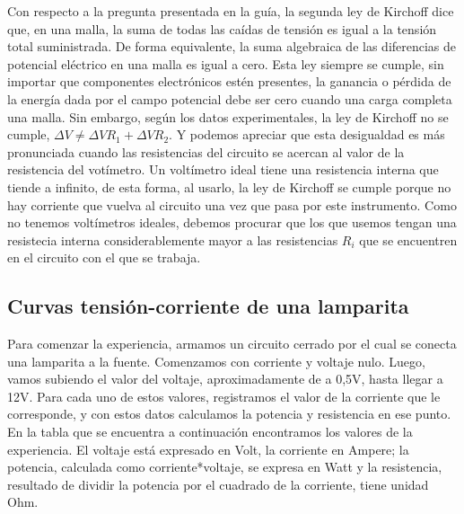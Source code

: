 \documentclass{article}
\begin{document}
Con respecto a la pregunta presentada en la guía, la segunda ley de Kirchoff dice que, en una malla, la suma de todas las caídas de tensión es igual a la 
tensión total suministrada. De forma equivalente, la suma algebraica de las diferencias de potencial eléctrico en una malla es igual a cero. Esta ley 
siempre se cumple, sin importar que componentes electrónicos estén presentes, la ganancia o pérdida de la energía dada por el campo potencial debe ser cero cuando una carga completa una malla. Sin embargo, según los datos experimentales, la ley de Kirchoff no se cumple, $\Delta V \neq \Delta VR_1 + \Delta VR_2 $. Y podemos apreciar que esta desigualdad es más pronunciada cuando las resistencias del circuito se acercan al valor de la resistencia del votímetro. Un voltímetro ideal tiene una resistencia interna que tiende a infinito, de esta forma, al usarlo, la ley de Kirchoff se cumple porque no hay corriente que vuelva al circuito una vez que pasa por este instrumento. Como no tenemos voltímetros ideales, debemos procurar que los que usemos tengan una resistecia interna considerablemente mayor a las resistencias $R_i$ que se encuentren en el circuito con el que se trabaja.

\subsection{Curvas tensión-corriente de una lamparita}
Para comenzar la experiencia, armamos un circuito cerrado por el cual se conecta una lamparita a la fuente. Comenzamos con corriente y voltaje nulo. Luego, vamos subiendo el valor del voltaje, aproximadamente de a 0,5V, hasta llegar a 12V. Para cada uno de estos valores, registramos el valor de la corriente que le corresponde, y con estos datos calculamos la potencia y resistencia en ese punto.
En la tabla que se encuentra a continuación encontramos los valores de la experiencia. El voltaje está expresado en Volt, la corriente en Ampere; la potencia, calculada como corriente*voltaje, se expresa en Watt y la resistencia, resultado de dividir la potencia por el cuadrado de la corriente, tiene unidad Ohm.
\end{document}
